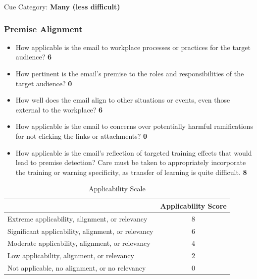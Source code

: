 \begin{fullwidth}
Cue Category: \textbf{Many (less difficult)}

\subsubsection{Premise Alignment} %

\begin{itemize}
    \item How applicable is the email to workplace processes or practices for the target
audience? \textbf{6}
    \item How pertinent is the email’s premise to the roles and responsibilities of the
target audience? \textbf{0}
    \item How well does the email align to other situations or events, even those external
to the workplace? \textbf{6}
    \item How applicable is the email to concerns over potentially harmful ramifications
for not clicking the links or attachments? \textbf{0}
    \item How applicable is the email’s reflection of targeted training effects that would
lead to premise detection? Care must be taken to appropriately incorporate the
training or warning specificity, as transfer of learning is quite difficult. \textbf{8}
\end{itemize}

\begin{table}[H]
\centering
\begin{tabular}{|l|c|}
\hline
\rowcolor[HTML]{96BEE6} 
\multicolumn{1}{|c|}{\cellcolor[HTML]{96BEE6}\textbf{Applicability Scale}} & \textbf{Applicability Score} \\ \hline
Extreme applicability, alignment, or relevancy                    & 8                   \\ \hline
Significant applicability, alignment, or relevancy                & 6                   \\ \hline
Moderate applicability, alignment, or relevancy                   & 4                   \\ \hline
Low applicability, alignment, or relevancy                        & 2                   \\ \hline
Not applicable, no alignment, or no relevancy                     & 0                   \\ \hline
\end{tabular}
\captionsetup{justification=centering}
\caption{Applicability Scale}
\end{table}


\end{fullwidth}
